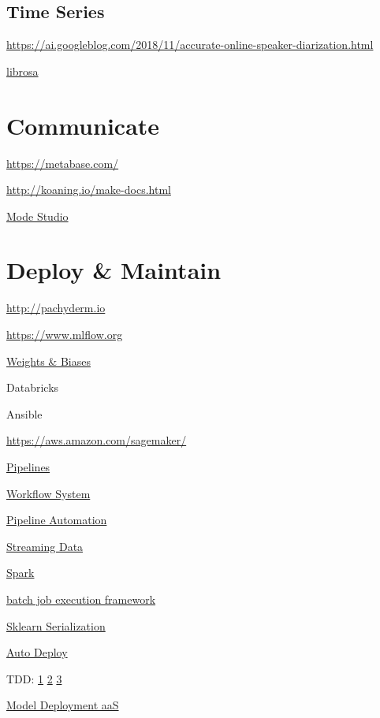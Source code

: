 \documentclass[]{book}
\begin{document}
\subsection{Time Series}\label{time-series-1}

\url{https://ai.googleblog.com/2018/11/accurate-online-speaker-diarization.html}

\href{https://librosa.github.io/librosa/tutorial.html\#overview}{librosa}

\section{Communicate}\label{communicate-2}

\url{https://metabase.com/}

\url{http://koaning.io/make-docs.html}

\href{https://about.modeanalytics.com/}{Mode Studio}

\section{Deploy \& Maintain}\label{deploy-maintain}

\url{http://pachyderm.io}

\url{https://www.mlflow.org}

\href{https://www.wandb.com/blog/towards-reproducibility}{Weights \&
Biases}

Databricks

Ansible

\url{https://aws.amazon.com/sagemaker/}

\href{http://stat545.com/automation01_slides/\#/automating-data-analysis-pipelines}{Pipelines}

\href{https://snakemake.readthedocs.io/en/stable/}{Workflow System}

\href{http://stat545.com/automation01_slides/\#/automating-data-analysis-pipelines}{Pipeline
Automation}

\href{https://www.wallaroolabs.com}{Streaming Data}

\href{https://docs.azuredatabricks.net/spark/latest/mllib/mllib-pipelines-and-stuctured-streaming.html}{Spark}

\href{https://stitchfix.github.io/flotilla-os/}{batch job execution
framework}

\href{https://cmry.github.io/notes/serialize}{Sklearn Serialization}

\href{http://content.nexosis.com/twimlai}{Auto Deploy}

TDD:
\href{http://engineering.pivotal.io/post/test-driven-development-for-data-science/}{1}
\textbar{} \href{http://www.tdda.info/}{2} \textbar{}
\href{http://stochasticsolutions.com/}{3}

\href{https://orchestrahq.com}{Model Deployment aaS}


\end{document}
